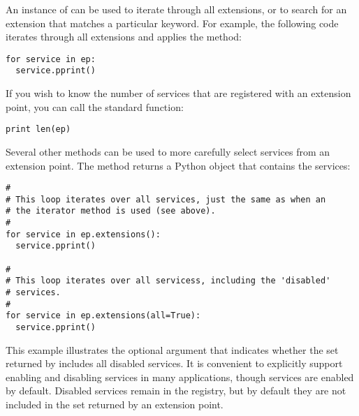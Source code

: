 An instance of  can be used to iterate through
all extensions, or to search for an extension that matches a particular
keyword. For example, the following code iterates through all extensions
and applies the  method:
\begin{lstlisting}
for service in ep:
  service.pprint()
\end{lstlisting}
If you wish to know the number of services that are registered with an
extension point, you can call the standard  function:
\begin{lstlisting}
print len(ep)
\end{lstlisting}
Several other methods can be used to more carefully select services from
an extension point. The  method returns a Python  object
that contains the services:
\begin{lstlisting}
#
# This loop iterates over all services, just the same as when an
# the iterator method is used (see above).
#
for service in ep.extensions():
  service.pprint()

#
# This loop iterates over all servicess, including the 'disabled'
# services.
#
for service in ep.extensions(all=True):
  service.pprint()
\end{lstlisting}
This example illustrates the optional argument that indicates whether
the set returned by  includes all disabled services. It is
convenient to explicitly support enabling and disabling services in many
applications, though services are enabled by default. Disabled services
remain in the registry, but by default they are not included in the set
returned by an extension point.

